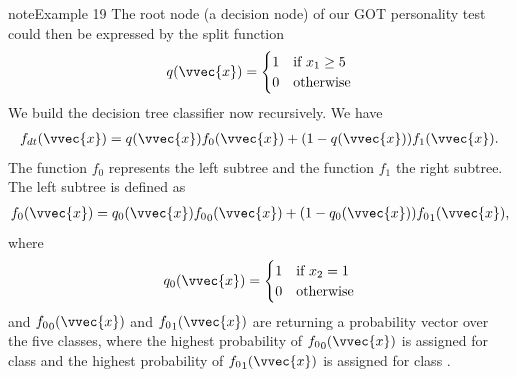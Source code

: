 \documentclass[letterpaper,10pt,english]{jupyterBook}
\begin{document}
\begin{sphinxadmonition}{note}{Example 19}
\sphinxAtStartPar
The root node (a decision node) of our GOT personality test could then be expressed by the split function
\begin{equation*}
\begin{split}q(\vvec{x})=\begin{cases}1 & \text{if }x_1\geq 5\\0 & \text{otherwise}\end{cases}\end{split}
\end{equation*}
We build the decision tree classifier now recursively. We have
\begin{equation*}
\begin{split}f_{dt}(\vvec{x})=q(\vvec{x})f_0(\vvec{x}) + (1-q(\vvec{x}))f_1(\vvec{x}).\end{split}
\end{equation*}
The function \(f_0\) represents the left subtree and the function \(f_1\) the right subtree. The left subtree is defined as
\begin{equation*}
\begin{split}f_0(\vvec{x})=q_0(\vvec{x}){f_0}_0(\vvec{x})+(1-q_0(\vvec{x})){f_0}_1(\vvec{x}),\end{split}
\end{equation*}
where
\begin{equation*}
\begin{split}q_0(\vvec{x})=\begin{cases}1 & \text{if }x_2=1\\0 & \text{otherwise}\end{cases}\end{split}
\end{equation*}
and \({f_0}_0(\vvec{x})\) and \({f_0}_1(\vvec{x})\) are returning a probability vector over the five classes, where the highest probability of \({f_0}_0(\vvec{x})\) is assigned for class  and the highest probability of \({f_0}_1(\vvec{x})\) is assigned for class .


\end{sphinxadmonition}
\end{document}
